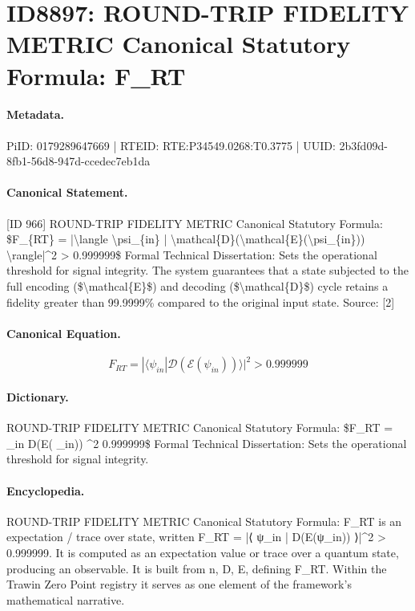 \section*{ID8897: ROUND-TRIP FIDELITY METRIC Canonical Statutory Formula: F\_RT}
\paragraph{Metadata.}
PiID: 0179289647669 | RTEID: RTE:P34549.0268:T0.3775 | UUID: 2b3fd09d-8fb1-56d8-947d-ccedec7eb1da

\paragraph{Canonical Statement.}
[ID 966] ROUND-TRIP FIDELITY METRIC Canonical Statutory Formula: \$F\_\{RT\} = |\textbackslash{}langle \textbackslash{}psi\_\{in\} | \textbackslash{}mathcal\{D\}(\textbackslash{}mathcal\{E\}(\textbackslash{}psi\_\{in\})) \textbackslash{}rangle|\textasciicircum{}2 > 0.999999\$ Formal Technical Dissertation: Sets the operational threshold for signal integrity. The system guarantees that a state subjected to the full encoding (\$\textbackslash{}mathcal\{E\}\$) and decoding (\$\textbackslash{}mathcal\{D\}\$) cycle retains a fidelity greater than 99.9999\% compared to the original input state. Source: [2]

\paragraph{Canonical Equation.}
\[
F_{RT} = |\langle \psi_{in} | \mathcal{D}(\mathcal{E}(\psi_{in})) \rangle|^2 > 0.999999
\]

\paragraph{Dictionary.}
ROUND-TRIP FIDELITY METRIC Canonical Statutory Formula: \$F\_RT = \_in D(E( \_in)) \textasciicircum{}2 0.999999\$ Formal Technical Dissertation: Sets the operational threshold for signal integrity.

\paragraph{Encyclopedia.}
ROUND-TRIP FIDELITY METRIC Canonical Statutory Formula: F\_RT is an expectation / trace over state, written F\_RT = |⟨ ψ\_in | D(E(ψ\_in)) ⟩|\textasciicircum{}2 > 0.999999. It is computed as an expectation value or trace over a quantum state, producing an observable. It is built from n, D, E, defining F\_RT. Within the Trawin Zero Point registry it serves as one element of the framework's mathematical narrative.

